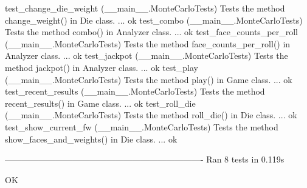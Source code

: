 test_change_die_weight (__main__.MonteCarloTests)
Tests the method change_weight() in Die class. ... ok
test_combo (__main__.MonteCarloTests)
Tests the method combo() in Analyzer class. ... ok
test_face_counts_per_roll (__main__.MonteCarloTests)
Tests the method face_counts_per_roll() in Analyzer class. ... ok
test_jackpot (__main__.MonteCarloTests)
Tests the method jackpot() in Analyzer class. ... ok
test_play (__main__.MonteCarloTests)
Tests the method play() in Game class. ... ok
test_recent_results (__main__.MonteCarloTests)
Tests the method recent_results() in Game class. ... ok
test_roll_die (__main__.MonteCarloTests)
Tests the method roll_die() in Die class. ... ok
test_show_current_fw (__main__.MonteCarloTests)
Tests the method show_faces_and_weights() in Die class. ... ok

----------------------------------------------------------------------
Ran 8 tests in 0.119s

OK